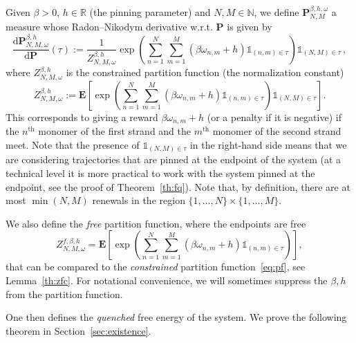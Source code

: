 \documentclass[10pt]{amsart}
\theoremstyle{definition}\newtheorem{defi}[theo]{Definition}\newtheorem{rema}[theo]{Remark}\newtheorem{exam}[theo]{Example}\newtheorem{exem}[theo]{Example}\newtheorem{nota}[theo]{Notation}
\DeclareMathOperator{\tHt}{th}
\newcommand{\gb}{\beta}
\newcommand{\go}{\omega}
\newcommand{\unbf}%
{\mathds{1}}
\newcommand{\dd}{\mathrm{d}}
\newcommand{\bP}{\ensuremath{\mathbf{P}}}
\newcommand{\bE}{\ensuremath{\mathbf{E}}}
\newcommand{\bbN}{\ensuremath{\mathbb{N}}}
\newcommand{\bbR}{\ensuremath{\mathbb{R}}}
\begin{document}
Given $\beta >0$, $h \in \bbR$ (the pinning parameter) and $N,M \in \bbN$, we define $\bP_{N,M}^{\beta,h,\omega}$ a measure whose Radon--Nikodym derivative w.r.t. $\bP$ is given by
\begin{equation}
\frac{\dd \bP_{N,M,\omega}^{\beta,h}}{\dd \bP} (\tau) := \frac{1}{Z_{N,M, \omega}^{\beta,h}} \exp \!\left(\sum_{n=1}^N \sum_{m=1}^M (\beta \omega_{n,m}+h) \unbf_{(n,m) \in \tau} \right)\! \unbf_{(N,M)\in \tau}\,,
\end{equation}
where $Z_{N,M,\omega}^{\beta,h}$ is the constrained partition function (the normalization constant)
\begin{equation}\label{eq:pf}
Z_{N,M,\omega}^{\beta,h} := \bE \left[\exp\! \left(\sum_{n=1}^N \sum_{m=1}^M (\beta \omega_{n,m} +h) \unbf_{(n,m) \in \tau} \right)\! \unbf_{(N,M)\in \tau} \right].
\end{equation}
This corresponds to giving a reward $\gb \go_{n,m}+h$ (or a penalty if it is negative) if the $n^{\tHt}$ monomer of the first strand and the $m^{\tHt}$ monomer of the second strand meet. Note that the presence of $\unbf_{(N,M)\in \tau}$ in the right-hand side means that we are considering trajectories that are pinned at the endpoint of the system (at a technical level it is more practical to work with the system pinned at the endpoint, see the proof of Theorem~\ref{th:fq}). Note that, by definition, there are at most $\min (N,M)$ renewals in the region $\{1,\ldots, N\}\times \{1,\ldots, M\}$.

We also define the \emph{free} partition function, where the endpoints are free
\begin{equation}\label{eq:free}
Z^{f,\beta,h}_{N,M,\omega}= \bE \left[\exp \!\left(\sum_{n=1}^N \sum_{m=1}^M (\beta \omega_{n,m} +h) \unbf_{(n,m) \in \tau} \right) \right],
\end{equation}
that can be compared to the \emph{constrained} partition function~\eqref{eq:pf}, see Lemma~\ref{th:zfc}. For notational convenience, we will sometimes suppress the $\beta,h$ from the partition function.


One then defines the \emph{quenched} free energy of the system. We prove the following theorem in Section~\ref{sec:existence}.
\end{document}
